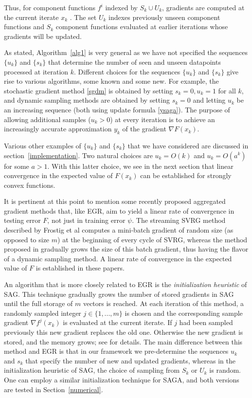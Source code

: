 \documentclass[11pt]{article}
\begin{document}
Thus, for  component functions $f^i$ indexed by $S_k \cup U_k$,  gradients are computed at the current iterate $x_k$ . The set $U_k$ indexes previously unseen component functions and $S_k$  component functions evaluated at earlier iterations whose gradients will be updated.

As stated, Algorithm~\ref{alg1} is very general as we have not specified the sequences $\{ u_k \}$ and $\{ s_k \}$ that determine the number of seen and unseen datapoints processed at iteration $k$. Different choices for the sequences $\{ u_k \}$ and $\{ s_k \}$ give rise to various algorithms, some known and some new. For example, the stochastic gradient method \eqref{sgdm} is obtained by setting $s_k=0, u_k =1$ for all $k$, and dynamic sampling methods are obtained by setting $s_k=0$ and letting $u_k$ be an increasing sequence (both using update formula \eqref{ysaga}). The purpose of allowing additional samples ($u_k >0$) at every iteration is to achieve an increasingly accurate approximation $y_k$ of the gradient $\nabla F(x_k)$. 

Various other examples of $\{ u_k \}$ and $\{ s_k \}$ that we have considered are discussed in section~\ref{implementation}. Two natural choices are $u_k = O(k)$ and $u_k = O(a^k)$ for some $a>1$. With this latter choice, we see in the next section that linear convergence in the expected value of $F(x_k)$ can be established for strongly convex functions. 

{\color{blue} It is pertinent at this point to mention some recently proposed aggregated gradient methods that, like EGR, aim to yield a linear rate of convergence in testing error $F$, not just in training error $\psi$. The streaming SVRG method described by Frostig et al \cite{frostig2014competing} computes a mini-batch gradient of random size (as opposed to size $m$) at the beginning of every cycle of SVRG, whereas  the method proposed in   \cite{babanezhad2015stop} gradually grows the size of this batch gradient, thus having the flavor of a dynamic sampling method. A linear rate of convergence in the expected value of $F$ is established in these papers. 



An algorithm that is more closely related to EGR is the  \emph{initialization heuristic} of SAG. This technique gradually grows the  number of stored gradients in SAG until the full storage of $m$ vectors is reached. At each iteration of this method, a randomly sampled integer $j \in \{1, ...,m\}$  is chosen and the corresponding sample gradient $\nabla f^j(x_k)$ is evaluated at the current iterate. If $j$ had been sampled previously this new gradient replaces the old one.  Otherwise the new gradient is stored, and the memory grows; see \cite{roux2012stochastic} for details. The main difference between this method and EGR is that in our framework we pre-determine the sequences $u_k$ and $s_k$ that specify the number of new and updated gradients, whereas in the {initialization heuristic} of SAG, the choice of sampling from $S_k$ or $U_k$ is random. One can employ a similar initialization technique for SAGA, and both versions are tested in Section~\ref{numerical}.
}
\end{document}
